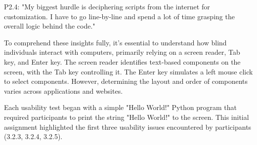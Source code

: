 P2.4: "My biggest hurdle is deciphering scripts from the internet for customization. I have to go line-by-line and spend a lot of time grasping the overall logic behind the code."

To comprehend these insights fully, it's essential to understand how blind individuals interact with computers, primarily relying on a screen reader, Tab key, and Enter key. The screen reader identifies text-based components on the screen, with the Tab key controlling it. The Enter key simulates a left mouse click to select components. However, determining the layout and order of components varies across applications and websites.

Each usability test began with a simple "Hello World!" Python program that required participants to print the string "Hello World!" to the screen. This initial assignment highlighted the first three usability issues encountered by participants (3.2.3, 3.2.4, 3.2.5).







